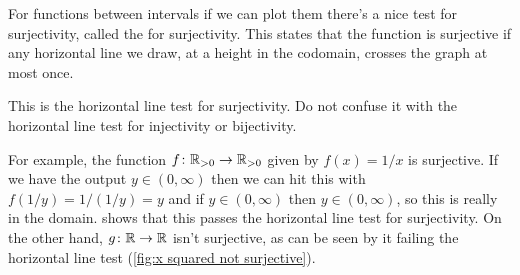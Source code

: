 \documentclass[fleqn]{LectureClass/LectureClass}
\begin{document}
    For functions between intervals if we can plot them there's a nice test for surjectivity, called the  for surjectivity.
    This states that the function is surjective if any horizontal line we draw, at a height in the codomain, crosses the graph at most once.
    
    \begin{wrn}
        This is the horizontal line test for surjectivity.
        Do not confuse it with the horizontal line test for injectivity or bijectivity.
    \end{wrn}
    
    For example, the function \(f \colon \mathbb{R}_{>0} \to \mathbb{R}_{>0}\) given by \(f(x) = 1/x\) is surjective.
    If we have the output \(y \in (0, \infty)\) then we can hit this with \(f(1/y) = 1/(1/y) = y\) and if \(y \in (0, \infty)\) then \(y \in (0, \infty)\), so this is really in the domain.
     shows that this passes the horizontal line test for surjectivity.
    On the other hand, \(g \colon \mathbb{R} \to \mathbb{R}\) isn't surjective, as can be seen by it failing the horizontal line test (\cref{fig:x squared not surjective}).
    
\end{document}
